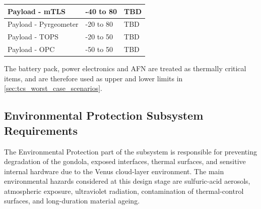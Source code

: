 \begin{table}[H]
\begin{tabular}{|p{6.8cm}|p{2.3cm}|p{2.3cm}|}
Payload - mTLS & -40 to 80 & TBD \\
\hline


Payload - Pyrgeometer & -20 to 80 & TBD \\
\hline




Payload - TOPS & -20 to 50 & TBD \\
\hline


Payload - OPC & -50 to 50 & TBD \\
\hline












\end{tabular}
\end{table}

The battery pack, power electronics and AFN are treated as thermally critical items, and are therefore used as upper and lower limits in \autoref{sec:tcs_worst_case_scenarios}.


\subsection{Environmental Protection Subsystem Requirements}
\label{sec:environmental_protection_requirements}

The Environmental Protection part of the subsystem is responsible for preventing degradation of the gondola, exposed interfaces, thermal surfaces, and sensitive internal hardware due to the Venus cloud-layer environment. The main environmental hazards considered at this design stage are sulfuric-acid aerosols, atmospheric exposure, ultraviolet radiation, contamination of thermal-control surfaces, and long-duration material ageing.

